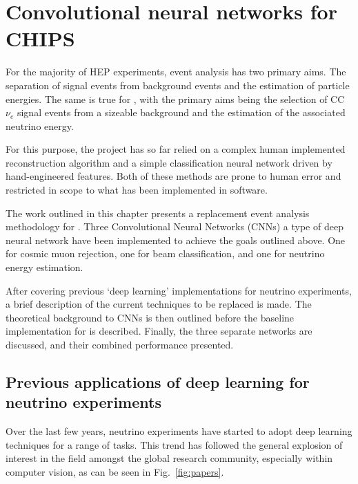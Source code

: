 \chapter{Convolutional neural networks for CHIPS} %
\label{chap:cvn} %

For the majority of HEP experiments, event analysis has two primary aims. The separation of signal
events from background events and the estimation of particle energies. The same is true for
\chips, with the primary aims being the selection of CC $\nu_{e}$ signal events from a sizeable
background and the estimation of the associated neutrino energy.

For this purpose, the \chips project has so far relied on a complex human implemented
reconstruction algorithm and a simple classification neural network driven by hand-engineered
features. Both of these methods are prone to human error and restricted in scope to what has been
implemented in software.

The work outlined in this chapter presents a replacement event analysis methodology for \chips.
Three Convolutional Neural Networks (CNNs) a type of deep neural network have been implemented to
achieve the goals outlined above. One for cosmic muon rejection, one for beam classification, and
one for neutrino energy estimation.

After covering previous `deep learning' implementations for neutrino experiments, a brief
description of the current techniques to be replaced is made. The theoretical background to CNNs
is then outlined before the baseline implementation for \chips is described. Finally, the three
separate networks are discussed, and their combined performance presented.

\section{Previous applications of deep learning for neutrino experiments} %
\label{sec:cvn_previous} %

Over the last few years, neutrino experiments have started to adopt deep learning techniques for a
range of tasks. This trend has followed the general explosion of interest in the field amongst the
global research community, especially within computer vision, as can be seen in
Fig.~\ref{fig:papers}.

